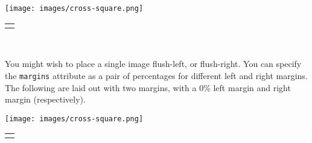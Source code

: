 \documentclass[10pt,]{article}
\theoremstyle{plain}
\theoremstyle{definition}
\theoremstyle{definition}
\theoremstyle{definition}
\theoremstyle{definition}
\theoremstyle{definition}
\theoremstyle{definition}
\numberwithin{equation}{section}
\newlength{\panelmax}
\begin{document}
{%
\setlength{\panelmax}{0pt}
\ifdefined\panelboxAimage\else\newsavebox{\panelboxAimage}\fi%
\begin{lrbox}{\panelboxAimage}
\texttt{[image: images/cross-square.png]}
\end{lrbox}
\ifdefined\phAimage\else\newlength{\phAimage}\fi%
\setlength{\phAimage}{\ht\panelboxAimage+\dp\panelboxAimage}
\settototalheight{\phAimage}{\usebox{\panelboxAimage}}
\setlength{\panelmax}{\maxof{\panelmax}{\phAimage}}
\leavevmode%
\setlength{\tabcolsep}{0\linewidth}
\par\medskip\noindent
\hspace*{0.25\linewidth}%
\begin{tabular}{@{}*{1}{c}@{}}
\begin{minipage}[c][\panelmax][t]{0.1\linewidth}\usebox{\panelboxAimage}\end{minipage}\end{tabular}\\
}%
\par
\hypertarget{p-660}{}%
You might wish to place a single image flush-left, or flush-right.  You can specify the \lstinline?margins? attribute as a pair of percentages for different left and right margins.  The following are laid out with two margins, with a 0\% left margin and right margin (respectively).%
{%
\setlength{\panelmax}{0pt}
\ifdefined\panelboxAimage\else\newsavebox{\panelboxAimage}\fi%
\begin{lrbox}{\panelboxAimage}
\texttt{[image: images/cross-square.png]}
\end{lrbox}
\ifdefined\phAimage\else\newlength{\phAimage}\fi%
\setlength{\phAimage}{\ht\panelboxAimage+\dp\panelboxAimage}
\settototalheight{\phAimage}{\usebox{\panelboxAimage}}
\setlength{\panelmax}{\maxof{\panelmax}{\phAimage}}
\leavevmode%
\setlength{\tabcolsep}{0\linewidth}
\par\medskip\noindent
\begin{tabular}{@{}*{1}{c}@{}}
\begin{minipage}[c][\panelmax][t]{0.1\linewidth}\usebox{\panelboxAimage}\end{minipage}\end{tabular}\\
}%
\end{document}
